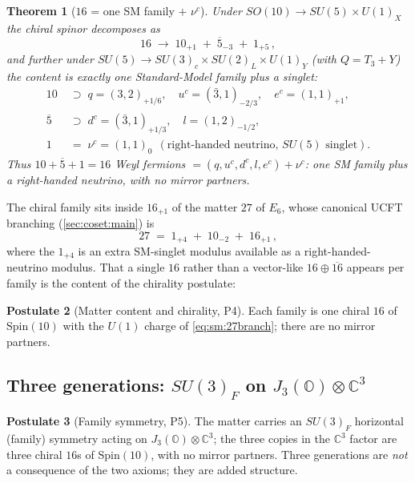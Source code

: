 \documentclass[11pt]{article}
\theoremstyle{plain}
\newtheorem{theorem}{Theorem}[section]
\theoremstyle{definition}
\newtheorem{postulate}[theorem]{Postulate}
\theoremstyle{remark}
\begin{document}
\begin{theorem}[$16$ = one SM family $+$ $\nu^c$]\label{thm:sm:family}
Under $SO(10)\to SU(5)\times U(1)_X$ the chiral spinor decomposes as
\begin{equation}\label{eq:sm:16branch}
16 \;\longrightarrow\; 10_{+1}\;+\;\overline{5}_{-3}\;+\;1_{+5}\,,
\end{equation}
and further under $SU(5)\to SU(3)_c\times SU(2)_L\times U(1)_Y$ (with $Q=T_3+Y$) the
content is exactly one Standard-Model family plus a singlet:
\begin{equation}\label{eq:sm:family}
\begin{aligned}
10 &\;\supset\; q=(3,2)_{+1/6},\quad u^c=(\bar3,1)_{-2/3},\quad e^c=(1,1)_{+1},\\
\overline{5} &\;\supset\; d^c=(\bar3,1)_{+1/3},\quad l=(1,2)_{-1/2},\\
1 &\;=\; \nu^c=(1,1)_{0}\ \ (\text{right-handed neutrino, $SU(5)$ singlet}).
\end{aligned}
\end{equation}
Thus $10+\overline{5}+1=16$ Weyl fermions $=(q,u^c,d^c,l,e^c)+\nu^c$: one SM family
plus a right-handed neutrino, with no mirror partners.
\end{theorem}

The chiral family sits inside $16_{+1}$ of the matter $27$ of $E_6$, whose canonical
UCFT branching (\autoref{sec:coset:main}) is
\begin{equation}\label{eq:sm:27branch}
27 \;=\; 1_{+4}\;+\;10_{-2}\;+\;16_{+1}\,,
\end{equation}
where the $1_{+4}$ is an extra SM-singlet modulus available as a right-handed-neutrino
modulus. That a single $16$ rather than a vector-like $16\oplus\overline{16}$ appears
per family is the content of the chirality postulate:

\begin{postulate}[Matter content and chirality, P4]\label{post:sm:P4}
Each family is one chiral $16$ of $\mathrm{Spin}(10)$ with the $U(1)$ charge of
\eqref{eq:sm:27branch}; there are no mirror partners.
\end{postulate}

\subsection{Three generations: \texorpdfstring{$SU(3)_F$}{SU(3)F} on
\texorpdfstring{$J_3(\mathbb{O})\otimes\mathbb{C}^3$}{J3(O)xC3}}
\label{sec:sm:generations}

\begin{postulate}[Family symmetry, P5]\label{post:sm:P5}
The matter carries an $SU(3)_F$ horizontal (family) symmetry acting on
$J_3(\mathbb{O})\otimes\mathbb{C}^3$; the three copies in the $\mathbb{C}^3$ factor are
three chiral $16$s of $\mathrm{Spin}(10)$, with no mirror partners. Three generations
are \emph{not} a consequence of the two axioms; they are added structure.
\end{postulate}
\end{document}
